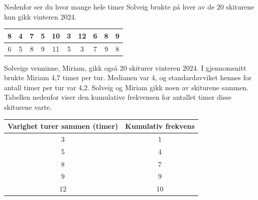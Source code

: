 \newpage
{}
Nedenfor ser du hvor mange hele timer Solveig brukte på hver av de 20 skiturene hun gikk
vinteren 2024.
\begin{center}
	\begin{tabular}{|c|c|c|c|c|c|c|c|c|c|}
		\hline
		8 & 4 & 7 & 5 & 10 & 3 & 12 & 6 & 8 & 9 \\
		\hline
		6 & 5 & 8 & 9 & 11 & 5 & 3 & 7 & 9 & 8 \\
		\hline
	\end{tabular}
\end{center}
Solveigs venninne, Miriam, gikk også 20 skiturer vinteren 2024. I gjennomsnitt brukte
Miriam 4,7 timer per tur. Medianen var 4, og standardavviket hennes for antall timer
per tur var 4,2.
Solveig og Miriam gikk noen av skiturene sammen. Tabellen nedenfor viser den
kumulative frekvensen for antallet timer disse skiturene varte.
\begin{center}
	\begin{tabular}{|c|c|}
		\hline
		Varighet turer sammen (timer) & Kumulativ frekvens \\
		\hline
		3 & 1 \\
		\hline
		5 & 4 \\
		\hline
		8 & 7 \\
		\hline
		9 & 9 \\
		\hline
		12 & 10 \\
		\hline
	\end{tabular}
\end{center}


